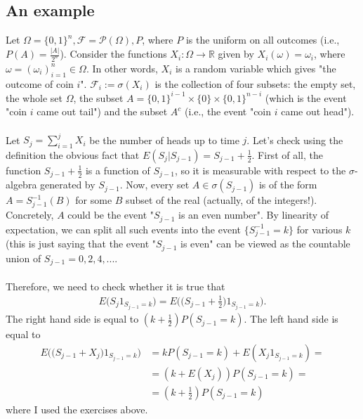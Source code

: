 \documentclass[12pt]{article}
\begin{document}
\subsection{An example} 
Let $\Omega=\{0,1\}^n, \mathcal F=\mathcal P(\Omega), P$, where $P$ is the uniform on all outcomes (i.e., $P(A)=\frac{|A|}{2^n}$). Consider the functions $X_i:\Omega\rightarrow \mathbb R$ given by $X_i(\omega)=\omega_i$, where $\omega=(\omega_i)_{i=1}^n\in \Omega$. In other words, $X_i$ is a random variable which gives "the outcome of coin $i$". $\mathcal F_i:=\sigma(X_i)$ is the collection of four subsets: the empty set, the whole set $\Omega$, the subset $A=\{0,1\}^{i-1}\times \{0\}\times \{0,1\}^{n-i}$ (which is the event "coin $i$ came out tail") and the subset $A^c$ (i.e., the event "coin $i$ came out head"). \\ \\
Let $S_j=\sum_{i=1}^{j}X_i$ be the number of heads up to time $j$. Let's check using the definition the obvious fact that $E(S_j|S_{j-1})=S_{j-1}+\frac{1}{2}$. First of all, the function $S_{j-1}+\frac{1}{2}$ is a function of $S_{j-1}$, so it is measurable with respect to the $\sigma$-algebra generated by $S_{j-1}$. Now, every set $A\in \sigma(S_{j-1})$ is of the form $A=S_{j-1}^{-1}(B)$ for some $B$ subset of the real (actually, of the integers!). Concretely, $A$ could be the event "$S_{j-1}$ is an even number". By linearity of expectation, we can split all such events into the event $\{S_{j-1}^{-1}=k\}$ for various $k$ (this is just saying that the event "$S_{j-1}$ is even" can be viewed as the countable union of $S_{j-1}=0, 2, 4, ...$. \\ \\
Therefore, we need to check whether it is true that 
\begin{align*}
E\Big(S_j1_{S_{j-1}=k}\Big)=E\Big(\Big(S_{j-1}+\frac{1}{2}\Big)1_{S_{j-1}=k}\Big).
\end{align*}
The right hand side is equal to $(k+\frac{1}{2})P(S_{j-1}=k)$. The left hand side is equal to 
\begin{align*}
E\Big(\Big(S_{j-1}+X_j\Big)1_{S_{j-1}=k}\Big)&=kP(S_{j-1}=k)+E(X_j1_{S_{j-1}=k})=\\&=(k+E(X_j))P(S_{j-1}=k)=\\&=(k+\frac{1}{2})P(S_{j-1}=k) 
\end{align*}
where I used the exercises above.
\end{document}
